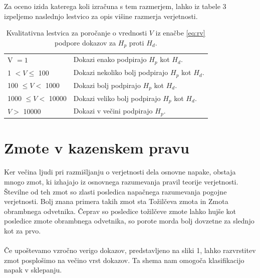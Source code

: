 \documentclass[mat1, tisk]{fmfdelo}
\theoremstyle{definition} %
\theoremstyle{trditev} %
\theoremstyle{izrek}
\begin{document}
Za oceno izida katerega koli izračuna s tem razmerjem, lahko iz tabele 3 izpeljemo naslednjo lestvico za opis višine razmerja verjetnosti.
\begin{table}[h!]
    \centering
    \caption{Kvalitativna lestvica za poročanje o vrednosti $V$ iz enačbe \eqref{eq:rv} podpore dokazov za $H_p$ proti $H_d$. \vspace{2mm}}
    \label{table:1}
     \begin{tabular}{l l}
        \hline
        V $= 1$ & Dokazi enako podpirajo $H_p$ kot $H_d$. \\
        1  $< V \le$  100 & Dokazi nekoliko bolj podpirajo $H_p$ kot $H_d$. \\
        100  $\le V <$  1000 & Dokazi bolj podpirajo $H_p$ kot $H_d$. \\
        1000  $\le V <$  10000 & Dokazi veliko bolj podpirajo $H_p$ kot $H_d$. \\
        $V >$ 10000 & Dokazi v večini podpirajo $H_p$. \\ [1ex]
        \hline
     \end{tabular}
 \end{table} 

\section{Zmote v kazenskem pravu}
Ker večina ljudi pri razmišljanju o verjetnosti dela osnovne napake, obstaja mnogo zmot, ki izhajajo iz osnovnega razumevanja pravil
teorije verjetnosti. Številne od teh zmot so zlasti posledica napačnega razumevanja pogojne verjetnosti. Bolj znana primera takih zmot sta
Tožilčeva zmota in Zmota obrambnega odvetnika. Čeprav so posledice tožilčeve zmote
lahko hujše kot posledice zmote obrambnega odvetnika, so porote morda bolj dovzetne za slednjo kot za prvo. \\\\
Če upoštevamo vzročno verigo dokazov, predstavljeno na sliki 1, lahko razvrstitev zmot posplošimo na večino vrst dokazov. Ta shema
nam omogoča klasifikacijo napak v sklepanju.
\end{document}
